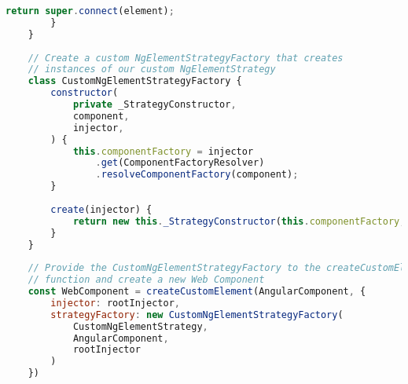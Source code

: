 \begin{lstlisting}[language={JavaScript},caption={The code for creating a Hierarchical Injector in an Angular Elements component},label={lst:appendix:hierarchical-injectors}]
			return super.connect(element);
		}
	}
	
	// Create a custom NgElementStrategyFactory that creates
	// instances of our custom NgElementStrategy
	class CustomNgElementStrategyFactory {
		constructor(
			private _StrategyConstructor,
			component,
			injector,
		) {
			this.componentFactory = injector
				.get(ComponentFactoryResolver)
				.resolveComponentFactory(component);
		}
	
		create(injector) {
			return new this._StrategyConstructor(this.componentFactory, injector);
		}
	}
	
	// Provide the CustomNgElementStrategyFactory to the createCustomElement
	// function and create a new Web Component
	const WebComponent = createCustomElement(AngularComponent, {
		injector: rootInjector,
		strategyFactory: new CustomNgElementStrategyFactory(
			CustomNgElementStrategy,
			AngularComponent,
			rootInjector
		)
	})
		\end{lstlisting}